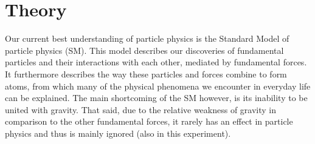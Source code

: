 \documentclass[twocolumn]{article}
\begin{document}
\section{Theory}
Our current best understanding of particle physics is the Standard Model of particle physics (SM). This model describes our discoveries of fundamental particles and their interactions with each other, mediated by fundamental forces. It furthermore describes the way these particles and forces combine to form atoms, from which many of the physical phenomena we encounter in everyday life can be explained. The main shortcoming of the SM however, is its inability to be united with gravity. That said, due to the relative weakness of gravity in comparison to the other fundamental forces, it rarely has an effect in particle physics and thus is mainly ignored (also in this experiment).
\end{document}
